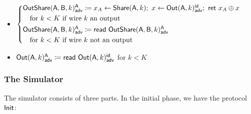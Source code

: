 \begin{itemize}
\item {\color{blue} $\begin{cases*} \LeakOutShare(\A,\B,k)^\A_\adv \coloneqq x_A \leftarrow \Share(\A,k); \ x \leftarrow \LeakOut(\A,k)^\id_\adv; \ \ret{x_A \oplus x} \\ \hspace{10pt} \text{for $k < K$ if wire $k$ an output} \\ \LeakOutShare(\A,\B,k)^\A_\adv \coloneqq \read{\LeakOutShare(\A,\B,k)^\A_\adv} \\ \hspace{10pt} \text{for $k < K$ if wire $k$ not an output} \end{cases*}$}
\item {\color{blue} $\mathsf{Out}(\mathsf{A},k)^{\mathsf{A}}_{\mathsf{adv}} \coloneqq \mathsf{read} \ \mathsf{Out}(\mathsf{A},k)^{\mathsf{id}}_{\mathsf{adv}}$ for $k < K$}
\end{itemize}

\subsubsection{The Simulator}
The simulator consists of three parts. In the initial phase, we have the protocol $\mathsf{Init}$:

